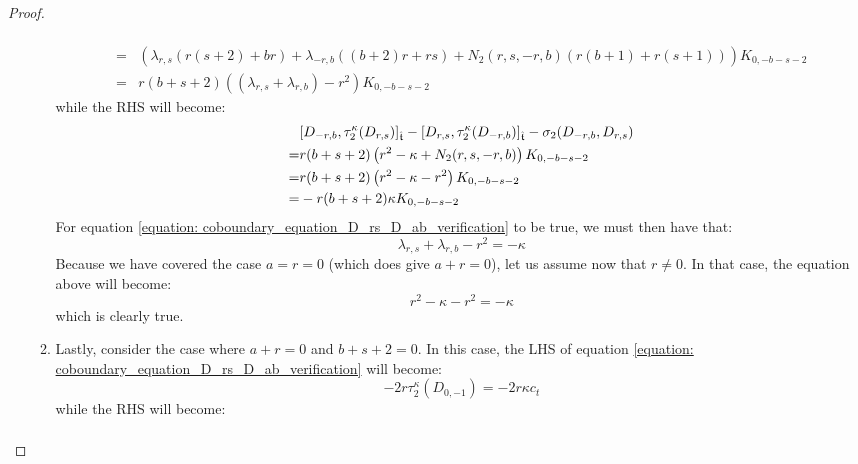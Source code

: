 \begin{proof}
\begin{enumerate}
\begin{enumerate}
$$\begin{aligned}
                                    \\
                                    = & \left( \lambda_{r, s} \left( r(s + 2) + br \right) + \lambda_{-r, b} \left( (b + 2) r + rs \right) + N_2(r, s, -r, b)\left( r(b + 1) + r(s + 1) \right) \right) K_{0, -b - s - 2}
                                    \\
                                    = & r (b + s + 2) \left( (\lambda_{r, s} + \lambda_{r, b}) - r^2 \right) K_{0, -b - s - 2}
                                \end{aligned}
                            $$
                        while the RHS will become:
                            $$
                                \begin{aligned}
                                    & [D_{-r, b}, \tau_2^{\kappa}(D_{r, s})]_{\extendedtoroidal} - [D_{r, s}, \tau_2^{\kappa}(D_{-r, b})]_{\extendedtoroidal} - \sigma_2(D_{-r, b}, D_{r, s})
                                    \\
                                    = & r (b + s + 2) \left( r^2 - \kappa + N_2(r, s, -r, b) \right) K_{0, -b - s - 2}
                                    \\
                                    = & r (b + s + 2) \left( r^2 - \kappa - r^2 \right) K_{0, -b - s - 2}
                                    \\
                                    = & -r (b + s + 2) \kappa K_{0, -b - s - 2}
                                \end{aligned}
                            $$
                        For equation \eqref{equation: coboundary_equation_D_rs_D_ab_verification} to be true, we must then have that:
                            $$\lambda_{r, s} + \lambda_{r, b} - r^2 = -\kappa$$
                        Because we have covered the case $a = r = 0$ (which does give $a + r = 0$), let us assume now that $r \not = 0$. In that case, the equation above will become:
                            $$r^2 - \kappa - r^2 = -\kappa$$
                        which is clearly true.
                        \item Lastly, consider the case where $a + r = 0$ and $b + s + 2 = 0$. In this case, the LHS of equation \eqref{equation: coboundary_equation_D_rs_D_ab_verification} will become:
                            $$-2r \tau_2^{\kappa}(D_{0, -1}) = -2r \kappa c_t$$
                        while the RHS will become:
                            $$
                                \begin{aligned}

\end{aligned}$$
\end{enumerate}
\end{enumerate}
\end{proof}
